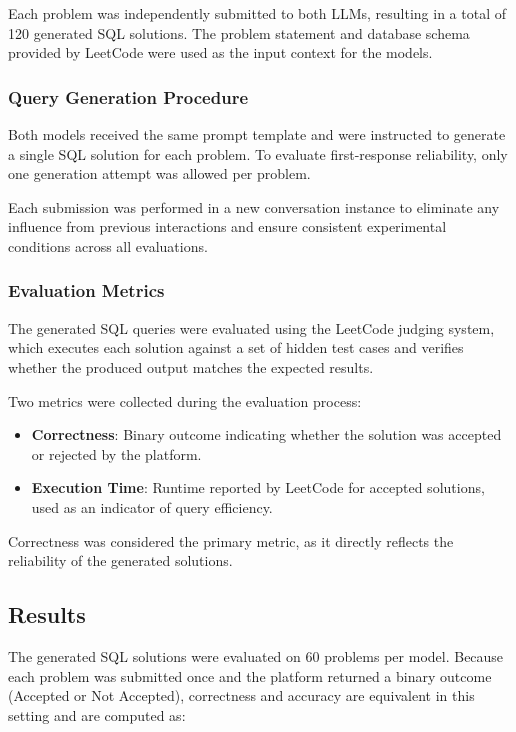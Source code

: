 \documentclass[11pt,a4paper]{article}
\begin{document}
Each problem was independently submitted to both LLMs, resulting in a total of 120 generated SQL solutions. The problem statement and database schema provided by LeetCode were used as the input context for the models.

\subsubsection{Query Generation Procedure}

Both models received the same prompt template and were instructed to generate a single SQL solution for each problem. To evaluate first-response reliability, only one generation attempt was allowed per problem.

Each submission was performed in a new conversation instance to eliminate any influence from previous interactions and ensure consistent experimental conditions across all evaluations.

\subsubsection{Evaluation Metrics}

The generated SQL queries were evaluated using the LeetCode judging system, which executes each solution against a set of hidden test cases and verifies whether the produced output matches the expected results.

Two metrics were collected during the evaluation process:

\begin{itemize}
    \item \textbf{Correctness}: Binary outcome indicating whether the solution was accepted or rejected by the platform.
    \item \textbf{Execution Time}: Runtime reported by LeetCode for accepted solutions, used as an indicator of query efficiency.
\end{itemize}

Correctness was considered the primary metric, as it directly reflects the reliability of the generated solutions.




\subsection{Results}

    The generated SQL solutions were evaluated on 60 problems per model. Because each problem was submitted once and the platform returned a binary outcome (Accepted or Not Accepted), correctness and accuracy are equivalent in this setting and are computed as:
\end{document}
